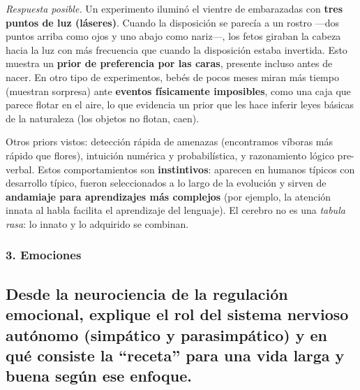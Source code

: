 \documentclass[11pt, a4paper]{article}
\newcommand{\pregunta}[1]{\subsection{#1}}
\newcommand{\eje}[1]{\subsubsection{#1}}
\begin{document}
\begin{respuesta}
\textit{Respuesta posible.} Un experimento ilumin\'o el vientre de embarazadas con \textbf{tres puntos de luz (l\'aseres)}. Cuando la disposici\'on se parec\'ia a un rostro ---dos puntos arriba como ojos y uno abajo como nariz---, los fetos giraban la cabeza hacia la luz con m\'as frecuencia que cuando la disposici\'on estaba invertida. Esto muestra un \textbf{prior de preferencia por las caras}, presente incluso antes de nacer. En otro tipo de experimentos, beb\'es de pocos meses miran m\'as tiempo (muestran sorpresa) ante \textbf{eventos f\'isicamente imposibles}, como una caja que parece flotar en el aire, lo que evidencia un prior que les hace inferir leyes b\'asicas de la naturaleza (los objetos no flotan, caen).

Otros priors vistos: detecci\'on r\'apida de amenazas (encontramos v\'iboras m\'as r\'apido que flores), intuici\'on num\'erica y probabil\'istica, y razonamiento l\'ogico pre-verbal. Estos comportamientos son \textbf{instintivos}: aparecen en humanos t\'ipicos con desarrollo t\'ipico, fueron seleccionados a lo largo de la evoluci\'on y sirven de \textbf{andamiaje para aprendizajes m\'as complejos} (por ejemplo, la atenci\'on innata al habla facilita el aprendizaje del lenguaje). El cerebro no es una \emph{tabula rasa}: lo innato y lo adquirido se combinan.
\end{respuesta}

\eje{3. Emociones}
\pregunta{Desde la neurociencia de la regulaci\'on emocional, explique el rol del \textbf{sistema nervioso aut\'onomo} (simp\'atico y parasimp\'atico) y en qu\'e consiste la ``receta'' para una vida larga y buena seg\'un ese enfoque.}
\end{document}
